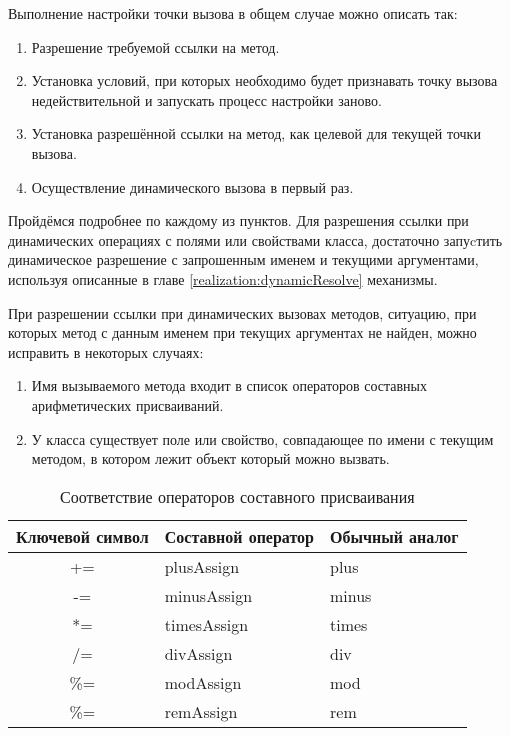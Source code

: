 Выполнение настройки точки вызова в общем случае можно описать так:

\begin{enumerate}
\item Разрешение требуемой ссылки на метод.
\item Установка условий, при которых необходимо будет признавать точку вызова недействительной и запускать процесс настройки заново.
\item Установка разрешённой ссылки на метод, как целевой для текущей точки вызова.
\item Осуществление динамического вызова в первый раз.
\end{enumerate}

Пройдёмся подробнее по каждому из пунктов. Для разрешения ссылки при динамических операциях с полями или свойствами класса, достаточно запуcтить динамическое разрешение с запрошенным именем и текущими аргументами, используя описанные в главе \ref{realization:dynamicResolve} механизмы.

При разрешении ссылки при динамических вызовах методов, ситуацию, при которых метод с данным именем при текущих аргументах не найден, можно исправить в некоторых случаях:

\begin{enumerate}
    \item Имя вызываемого метода входит в список операторов составных арифметических присваиваний.
    \item У класса существует поле или свойство, совпадающее по имени с текущим методом, в котором лежит объект который можно вызвать.
\end{enumerate}


\begin{table}[h]
\caption{\label{tab:compoundAssignment}Соответствие операторов составного присваивания}
\begin{center}
\begin{tabular}{|c|l|l|}
\hline
Ключевой символ & Составной оператор	& Обычный аналог \\
\hline
+=  & plusAssign             & plus   \\
-=  & minusAssign            & minus  \\
*=  & timesAssign            & times  \\
/=  & divAssign              & div    \\
\%= & modAssign              & mod    \\
\%= & remAssign\footnotemark & rem\footnotemark[\value{footnote}]   \\
\hline
\end{tabular}
\end{center}
\end{table} 

